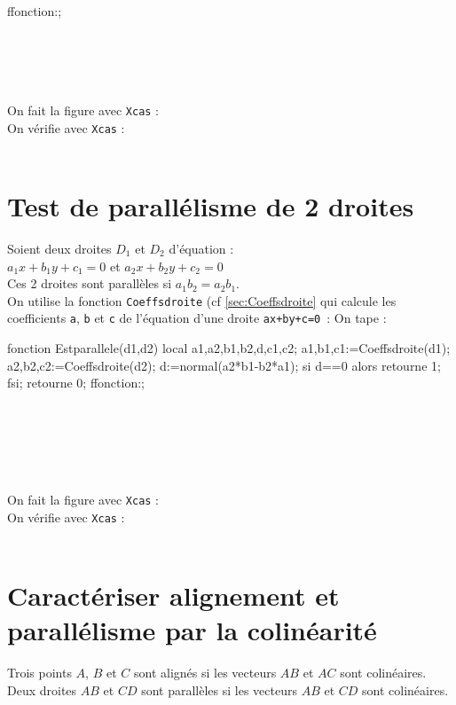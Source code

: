 \documentclass[12pt,a4paper]{book}
\begin{document}
\begin{giacjshere}
\begin{giacprog}
ffonction:;
\end{giacprog}
\\
\\
\\
\\
On fait la figure avec {\tt Xcas} :\\
On v\'erifie avec {\tt Xcas} :\\
\\
\section{Test de parall\'elisme de 2 droites}
Soient deux droites $D_1$ et $D_2$ d'\'equation :\\
$a_1x+b_1y+c_1=0$ et $a_2x+b_2y+c_2=0$\\
Ces 2 droites sont parall\`eles si $a_1b_2=a_2b_1$.\\
On utilise la fonction {\tt Coeffsdroite} (cf \ref{sec:Coeffsdroite} qui calcule
les coefficients {\tt a}, {\tt b} et {\tt c} de l'\'equation d'une droite 
{\tt ax+by+c=0}~:
On tape :
\begin{giacprog}
fonction Estparallele(d1,d2)
 local a1,a2,b1,b2,d,c1,c2;
 a1,b1,c1:=Coeffsdroite(d1);
 a2,b2,c2:=Coeffsdroite(d2);
 d:=normal(a2*b1-b2*a1);
 si d==0 alors retourne 1; fsi;
 retourne 0;
ffonction:;
\end{giacprog}
\\
\\
\\
\\
\\
On fait la figure avec {\tt Xcas} :\\
On v\'erifie avec {\tt Xcas} :\\
\\

\section{Caract\'eriser alignement et parall\'elisme par la colin\'earit\'e} 
Trois points $A$, $ B$ et $ C$ sont align\'es si les vecteurs 
$ AB$ et $ AC$ sont colin\'eaires.\\
Deux droites $ AB$ et $ CD$ sont parall\`eles si les vecteurs $ AB$ et 
$ CD$ sont colin\'eaires.


\end{giacjshere}
\end{document}
